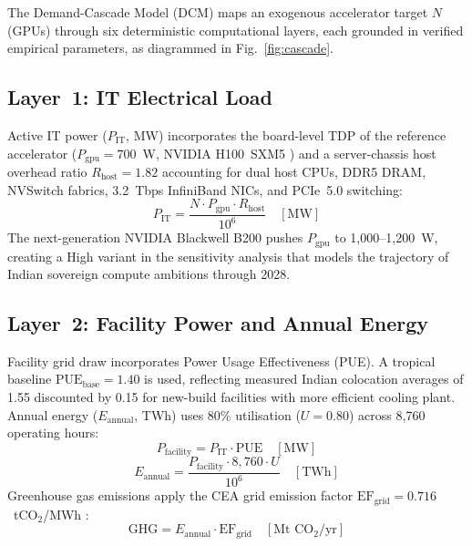 \documentclass[conference]{IEEEtran}
\begin{document}
The Demand-Cascade Model (DCM) maps an exogenous accelerator target $N$ (GPUs) through six deterministic computational layers, each grounded in verified empirical parameters, as diagrammed in Fig.~\ref{fig:cascade}.

\subsection{Layer~1: IT Electrical Load}

Active IT power ($P_{\text{IT}}$, MW) incorporates the board-level TDP of the reference accelerator ($P_{\text{gpu}} = 700$~W, NVIDIA H100~SXM5 \cite{nvidia2024h100}) and a server-chassis host overhead ratio $R_{\text{host}} = 1.82$ accounting for dual host CPUs, DDR5 DRAM, NVSwitch fabrics, 3.2~Tbps InfiniBand NICs, and PCIe~5.0 switching:
\begin{equation}
  P_{\text{IT}} = \frac{N \cdot P_{\text{gpu}} \cdot R_{\text{host}}}{10^{6}} \quad [\text{MW}]
  \label{eq:it_load}
\end{equation}
The next-generation NVIDIA Blackwell B200 pushes $P_{\text{gpu}}$ to 1{,}000--1{,}200~W, creating a High variant in the sensitivity analysis that models the trajectory of Indian sovereign compute ambitions through 2028.

\subsection{Layer~2: Facility Power and Annual Energy}

Facility grid draw incorporates Power Usage Effectiveness (PUE). A tropical baseline $\text{PUE}_{\text{base}} = 1.40$ is used, reflecting measured Indian colocation averages of 1.55 \cite{sbicap2025datacentre} discounted by 0.15 for new-build facilities with more efficient cooling plant. Annual energy ($E_{\text{annual}}$, TWh) uses 80\% utilisation ($U = 0.80$) across 8{,}760 operating hours:
\begin{equation}
  P_{\text{facility}} = P_{\text{IT}} \cdot \text{PUE} \quad [\text{MW}]
  \label{eq:facility}
\end{equation}
\begin{equation}
  E_{\text{annual}} = \frac{P_{\text{facility}} \cdot 8{,}760 \cdot U}{10^{6}} \quad [\text{TWh}]
  \label{eq:energy}
\end{equation}
Greenhouse gas emissions apply the CEA grid emission factor $\text{EF}_{\text{grid}} = 0.716$~tCO$_2$/MWh \cite{cea2026transmission}:
\begin{equation}
  \text{GHG} = E_{\text{annual}} \cdot \text{EF}_{\text{grid}} \quad [\text{Mt CO}_2/\text{yr}]
  \label{eq:ghg}
\end{equation}
\end{document}
